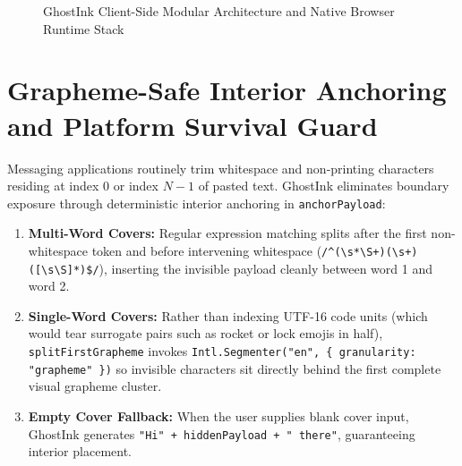 \documentclass[12pt,a4paper,oneside,openany]{report}
\begin{document}
\begin{figure}[H]
{%
}
\caption{GhostInk Client-Side Modular Architecture and Native Browser Runtime Stack}
\label{fig:system_arch}
\end{figure}

\section{Grapheme-Safe Interior Anchoring and Platform Survival Guard}
Messaging applications routinely trim whitespace and non-printing characters residing at index $0$ or index $N-1$ of pasted text. GhostInk eliminates boundary exposure through deterministic interior anchoring in \texttt{anchorPayload}:
\begin{enumerate}
    \item \textbf{Multi-Word Covers:} Regular expression matching splits after the first non-whitespace token and before intervening whitespace (\texttt{/\^{}(\textbackslash s*\textbackslash S+)(\textbackslash s+)([\textbackslash s\textbackslash S]*)\$/}), inserting the invisible payload cleanly between word 1 and word 2.
    \item \textbf{Single-Word Covers:} Rather than indexing UTF-16 code units (which would tear surrogate pairs such as rocket or lock emojis in half), \texttt{splitFirstGrapheme} invokes \texttt{Intl.Segmenter("en", \{ granularity: "grapheme" \})} so invisible characters sit directly behind the first complete visual grapheme cluster.
    \item \textbf{Empty Cover Fallback:} When the user supplies blank cover input, GhostInk generates \texttt{"Hi" + hiddenPayload + " there"}, guaranteeing interior placement.
\end{enumerate}
\end{document}
